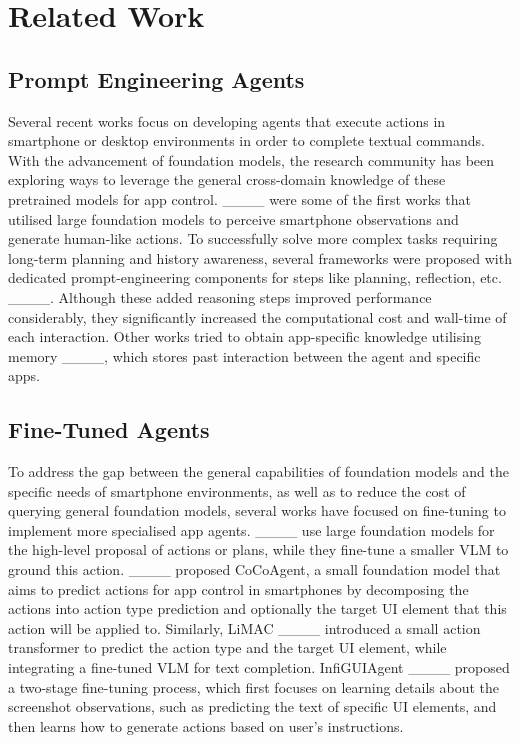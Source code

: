 \section{Related Work}
\subsection{Prompt Engineering Agents}

Several recent works focus on developing agents that execute actions in smartphone or desktop environments in order to complete textual commands. With the advancement of foundation models, the research community has been exploring ways to leverage the general cross-domain knowledge of these pretrained models for app control. ____ were some of the first works that utilised large foundation models to perceive smartphone observations and generate human-like actions. To successfully solve more complex tasks requiring long-term planning and history awareness, several frameworks were proposed with dedicated prompt-engineering components for steps like planning, reflection, etc. ____. Although these added reasoning steps improved performance considerably, they significantly increased the computational cost and wall-time of each interaction. 
Other works tried to obtain app-specific knowledge utilising memory ____, which stores past interaction between the agent and specific apps.

\subsection{Fine-Tuned Agents}

To address the gap between the general capabilities of foundation models and the specific needs of smartphone environments, as well as to reduce the cost of querying general foundation models, several works have focused on fine-tuning to implement more specialised app agents. ____ use large foundation models for the high-level proposal of actions or plans, while they fine-tune a smaller VLM to ground this action. ____ proposed CoCoAgent, a small foundation model that aims to predict actions for app control in smartphones by decomposing the actions into action type prediction and optionally the target UI element that this action will be applied to.
Similarly, LiMAC ____ introduced a small action transformer to predict the action type and the target UI element, while integrating a fine-tuned VLM for text completion. 
InfiGUIAgent ____ proposed a two-stage fine-tuning process, which first focuses on learning details about the screenshot observations, such as predicting the text of specific UI elements, and then learns how to generate actions based on user's instructions. 

